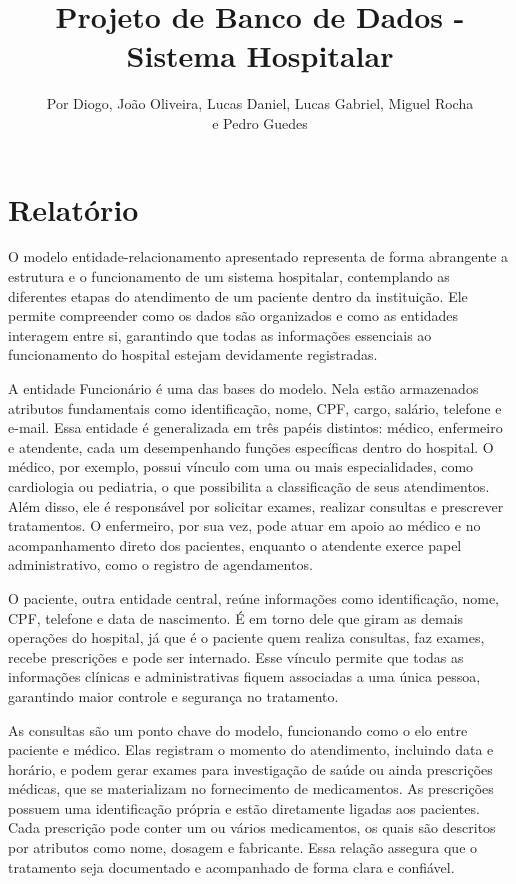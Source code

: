 \documentclass[a4paper,12pt]{article}
\title{Projeto de Banco de Dados - Sistema Hospitalar}
\author{Por Diogo, João Oliveira, Lucas Daniel, Lucas Gabriel, Miguel Rocha \\ e Pedro Guedes}
\date{}
\begin{document}
\maketitle

\section*{Relatório}

O modelo entidade-relacionamento apresentado representa de forma abrangente a estrutura e o funcionamento de um sistema hospitalar, contemplando as diferentes etapas do atendimento de um paciente dentro da instituição. Ele permite compreender como os dados são organizados e como as entidades interagem entre si, garantindo que todas as informações essenciais ao funcionamento do hospital estejam devidamente registradas.

A entidade Funcionário é uma das bases do modelo. Nela estão armazenados atributos fundamentais como identificação, nome, CPF, cargo, salário, telefone e e-mail. Essa entidade é generalizada em três papéis distintos: médico, enfermeiro e atendente, cada um desempenhando funções específicas dentro do hospital. O médico, por exemplo, possui vínculo com uma ou mais especialidades, como cardiologia ou pediatria, o que possibilita a classificação de seus atendimentos. Além disso, ele é responsável por solicitar exames, realizar consultas e prescrever tratamentos. O enfermeiro, por sua vez, pode atuar em apoio ao médico e no acompanhamento direto dos pacientes, enquanto o atendente exerce papel administrativo, como o registro de agendamentos.

O paciente, outra entidade central, reúne informações como identificação, nome, CPF, telefone e data de nascimento. É em torno dele que giram as demais operações do hospital, já que é o paciente quem realiza consultas, faz exames, recebe prescrições e pode ser internado. Esse vínculo permite que todas as informações clínicas e administrativas fiquem associadas a uma única pessoa, garantindo maior controle e segurança no tratamento.

As consultas são um ponto chave do modelo, funcionando como o elo entre paciente e médico. Elas registram o momento do atendimento, incluindo data e horário, e podem gerar exames para investigação de saúde ou ainda prescrições médicas, que se materializam no fornecimento de medicamentos. As prescrições possuem uma identificação própria e estão diretamente ligadas aos pacientes. Cada prescrição pode conter um ou vários medicamentos, os quais são descritos por atributos como nome, dosagem e fabricante. Essa relação assegura que o tratamento seja documentado e acompanhado de forma clara e confiável.
\end{document}
